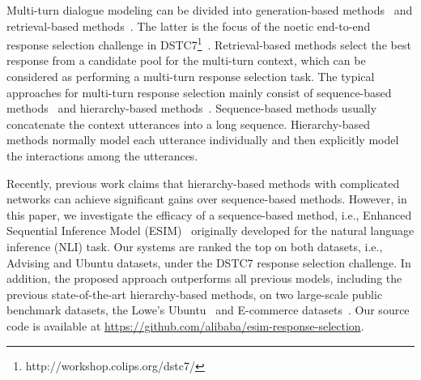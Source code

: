 \documentclass[letterpaper]{article} \usepackage{aaai19}  \usepackage{times}  \usepackage{helvet}  \usepackage{courier}  \usepackage{url}  \usepackage{graphicx}
\begin{document}
Multi-turn dialogue modeling can be divided into generation-based methods~\cite{DBLP:conf/aaai/SerbanSBCP16,DBLP:conf/aaai/ZhouLCLCH17} and retrieval-based methods~\cite{DBLP:conf/sigdial/LowePSP15,DBLP:conf/acl/WuWXZL17}. The latter is the focus of the noetic end-to-end response selection challenge in DSTC7\footnote{http://workshop.colips.org/dstc7/}~\cite{DSTC7}. Retrieval-based methods select the best response from a candidate pool for the multi-turn context, which can be considered as performing a multi-turn response selection task.
The typical approaches for multi-turn response selection mainly consist of sequence-based methods~\cite{DBLP:conf/sigdial/LowePSP15,DBLP:conf/sigir/YanSW16} and hierarchy-based methods~\cite{DBLP:conf/emnlp/ZhouDWZYTLY16,DBLP:conf/acl/WuWXZL17,DBLP:conf/coling/ZhangLZZL18,DBLP:conf/acl/WuLCZDYZL18}. Sequence-based methods usually concatenate the context utterances into a long sequence. Hierarchy-based methods normally model each utterance individually and then explicitly model the interactions among the utterances. 

Recently, previous work \cite{DBLP:conf/acl/WuWXZL17,DBLP:conf/coling/ZhangLZZL18} claims that hierarchy-based methods with complicated networks can achieve significant gains over sequence-based methods. However, in this paper, we investigate the efficacy of a sequence-based method, i.e., Enhanced Sequential Inference Model (ESIM)~\cite{DBLP:conf/acl/ChenZLWJI17} originally developed for the natural language inference (NLI) task. Our systems are ranked the top on both datasets, i.e., Advising and Ubuntu datasets, under the DSTC7 response selection challenge. In addition, the proposed approach outperforms all previous models, including the previous state-of-the-art hierarchy-based methods, on two large-scale public benchmark datasets, the Lowe's Ubuntu~\cite{DBLP:conf/sigdial/LowePSP15} and
E-commerce datasets~\cite{DBLP:conf/coling/ZhangLZZL18}. Our source code is available at \url{https://github.com/alibaba/esim-response-selection}.
\end{document}
